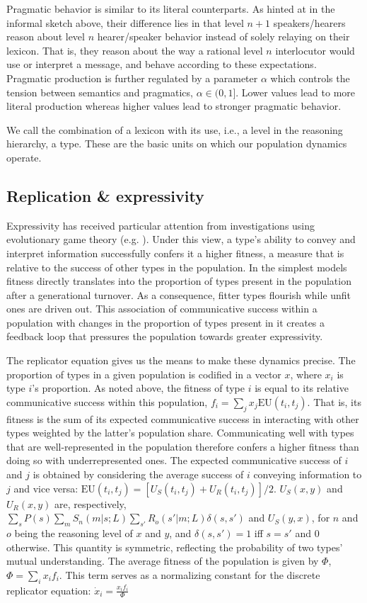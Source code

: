 \documentclass[a4paper]{article}
\begin{document}
Pragmatic behavior is similar to its literal counterparts. As hinted at in the informal sketch above, their difference lies in that level $n+1$ speakers/hearers reason about level $n$ hearer/speaker behavior instead of solely relaying on their lexicon. That is, they reason about the way a rational level $n$ interlocutor would use or interpret a message, and behave according to these expectations. Pragmatic production is further regulated by a parameter $\alpha$ which controls the tension between semantics and pragmatics, $\alpha \in (0,1]$. Lower values lead to more literal production whereas higher values lead to stronger pragmatic behavior. 

We call the combination of a lexicon with its use, i.e., a level in the reasoning hierarchy, a type. These are the basic units on which our population dynamics operate. 

\subsection{Replication \& expressivity}\label{sec:expressivity}
Expressivity has received particular attention from investigations using evolutionary game theory (e.g. \citealt{nowak+krakauer:1999,nowak+etal:2000, nowak+etal:2002}). Under this view, a type's ability to convey and interpret information successfully confers it a higher fitness, a measure that is relative to the success of other types in the population. In the simplest models fitness directly translates into the proportion of types present in the population after a generational turnover. As a consequence, fitter types flourish while unfit ones are driven out. This association of communicative success within a population with changes in the proportion of types present in it creates a feedback loop that pressures the population towards greater expressivity. 

The replicator equation gives us the means to make these dynamics precise. The proportion of types in a given population is codified in a vector $x$, where $x_i$ is type $i$'s proportion. As noted above, the fitness of type $i$ is equal to its relative communicative success within this population, $f_i = \sum_j x_j \text{EU}(t_i,t_j)$. That is, its fitness is the sum of its expected communicative success in interacting with other types weighted by the latter's population share. Communicating well with types that are well-represented in the population therefore confers a higher fitness than doing so with underrepresented ones. The expected communicative success of $i$ and $j$ is obtained by considering the average success of $i$ conveying information to $j$ and vice versa: $\text{EU}(t_i,t_j) = [U_S(t_i,t_j) + U_R(t_i,t_j)]/2$. $U_S(x,y)$ and $U_R(x,y)$ are, respectively, $\sum_s P(s)\sum_m S_n(m|s;L) \sum_{s'} R_o(s'|m;L) \delta(s,s')$ and $U_S(y,x)$, for $n$ and $o$ being the reasoning level of $x$ and $y$, and $\delta(s,s') = 1$ iff $s = s'$ and $0$ otherwise. This quantity is symmetric, reflecting the probability of two types' mutual understanding. The average fitness of the population is given by $\Phi$, $\Phi = \sum_i x_i f_i$. This term serves as a normalizing constant for the discrete replicator equation: $\dot{x}_i = \frac{x_i f_i}{\Phi}$ 
\end{document}
